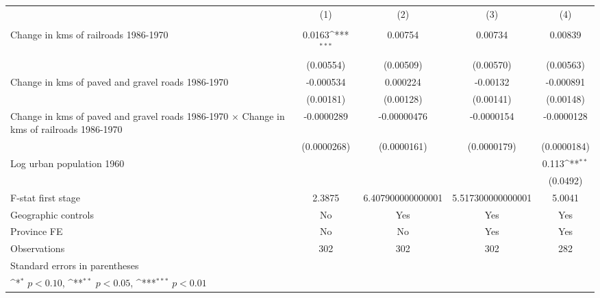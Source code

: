 {
\def\sym#1{\ifmmode^{#1}\else\(^{#1}\)\fi}
\begin{tabular}{l*{4}{c}}
\hline\hline
                &\multicolumn{1}{c}{(1)}&\multicolumn{1}{c}{(2)}&\multicolumn{1}{c}{(3)}&\multicolumn{1}{c}{(4)}\\
                &\multicolumn{1}{c}{}&\multicolumn{1}{c}{}&\multicolumn{1}{c}{}&\multicolumn{1}{c}{}\\
\hline
Change in kms of railroads 1986-1970&   0.0163\sym{***}&  0.00754         &  0.00734         &  0.00839         \\
                &(0.00554)         &(0.00509)         &(0.00570)         &(0.00563)         \\
[1em]
Change in kms of paved and gravel roads 1986-1970&-0.000534         & 0.000224         & -0.00132         &-0.000891         \\
                &(0.00181)         &(0.00128)         &(0.00141)         &(0.00148)         \\
[1em]
Change in kms of paved and gravel roads 1986-1970 $\times$ Change in kms of railroads 1986-1970&-0.0000289         &-0.00000476         &-0.0000154         &-0.0000128         \\
                &(0.0000268)         &(0.0000161)         &(0.0000179)         &(0.0000184)         \\
[1em]
Log urban population 1960&                  &                  &                  &    0.113\sym{**} \\
                &                  &                  &                  & (0.0492)         \\
\hline
F-stat first stage&   2.3875         &6.407900000000001         &5.517300000000001         &   5.0041         \\
Geographic controls&       No         &      Yes         &      Yes         &      Yes         \\
Province FE     &       No         &       No         &      Yes         &      Yes         \\
Observations    &      302         &      302         &      302         &      282         \\
\hline\hline
\multicolumn{5}{l}{\footnotesize Standard errors in parentheses}\\
\multicolumn{5}{l}{\footnotesize \sym{*} \(p<0.10\), \sym{**} \(p<0.05\), \sym{***} \(p<0.01\)}\\
\end{tabular}
}
